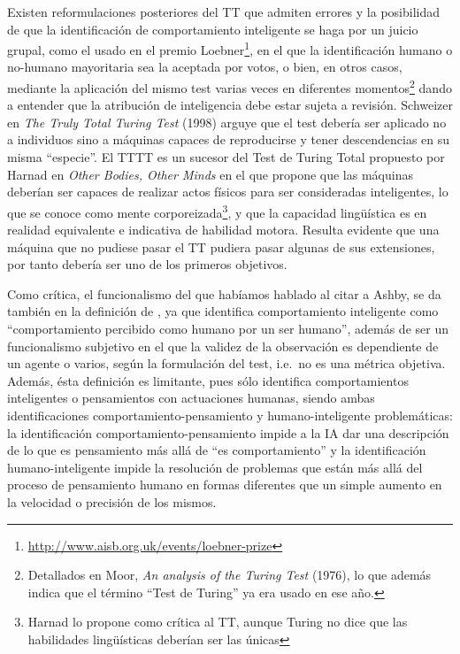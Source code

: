\documentclass[12pt]{memoir}
\begin{document}
Existen reformulaciones posteriores del TT que admiten errores y la posibilidad de que la identificación de comportamiento inteligente se haga por un juicio grupal, como el usado en el premio Loebner\footnote{\url{http://www.aisb.org.uk/events/loebner-prize} }, en el que la identificación humano o no-humano mayoritaria sea la aceptada por votos, o bien, en otros casos, mediante la aplicación del mismo test varias veces en diferentes momentos\footnote{Detallados en Moor, \textit{An analysis of the Turing Test} (1976), lo que además indica que el término ``Test de Turing'' ya era usado en ese año.} dando a entender que la atribución de inteligencia debe estar sujeta a revisión. Schweizer en \textit{The Truly Total Turing Test} (1998) arguye que el test debería ser aplicado no a individuos sino a máquinas capaces de reproducirse y tener descendencias en su misma ``especie''. El TTTT es un sucesor del Test de Turing Total propuesto por Harnad en \textit{Other Bodies, Other Minds} en el que propone que las máquinas deberían ser capaces de realizar actos físicos para ser consideradas inteligentes, lo que se conoce como mente corporeizada\footnote{Harnad lo propone como crítica al TT, aunque Turing no dice que las habilidades lingüísticas deberían ser las únicas}, y que la capacidad lingüística es en realidad equivalente e indicativa de habilidad motora. Resulta evidente que una máquina que no pudiese pasar el TT pudiera pasar algunas de sus extensiones, por tanto debería ser uno de los primeros objetivos.

Como crítica, el funcionalismo del que habíamos hablado al citar a Ashby, se da también en la definición de \parencite{Turing1950cmi}, ya que identifica comportamiento inteligente como ``comportamiento percibido como humano por un ser humano'', además de ser un funcionalismo subjetivo en el que la validez de la observación es dependiente de un agente o varios, según la formulación del test, i.e.\ no es una métrica objetiva. Además, ésta definición es limitante, pues sólo identifica comportamientos inteligentes o pensamientos con actuaciones humanas, siendo ambas identificaciones comportamiento-pensamiento y humano-inteligente problemáticas: la identificación comportamiento-pensamiento impide a la IA dar una descripción de lo que es pensamiento más allá de ``es comportamiento'' y la identificación humano-inteligente impide la resolución de problemas que están más allá del proceso de pensamiento humano en formas diferentes que un simple aumento en la velocidad o precisión de los mismos. 
\end{document}
